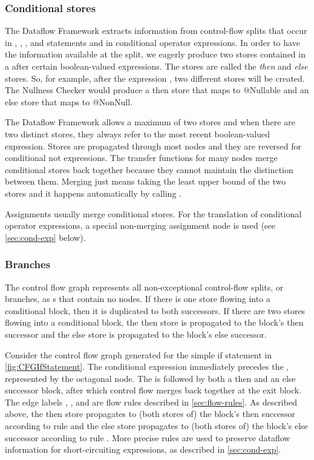 \subsubsection{Conditional stores}
\label{sec:cond-stores}

The Dataflow Framework extracts information from control-flow splits
that occur in , , , and 
statements and in conditional operator expressions.  In order to have
the information available at the split, we eagerly produce two stores
contained in a  after certain
boolean-valued expressions.  The stores are called the \emph{then} and
\emph{else} stores.  So, for example, after the expression , two different stores will be created.  The Nullness Checker
would produce a then store that maps  to @Nullable and an else
store that maps  to @NonNull.

The Dataflow Framework allows a maximum of two stores and when there
are two distinct stores, they always refer to the most recent
boolean-valued expression.  Stores are propagated through most nodes
and they are reversed for conditional not expressions.  The transfer
functions for many nodes merge conditional stores back together
because they cannot maintain the distinction between them.  Merging
just means taking the least upper bound of the two stores and it
happens automatically by calling .

Assignments usually merge conditional stores. For the translation of
conditional operator expressions, a special non-merging assignment
node is used (see \autoref{sec:cond-exp} below).

\subsubsection{Branches}

The control flow graph represents all non-exceptional control-flow
splits, or branches, as s that contain no
nodes.  If there is one store flowing into a conditional block, then
it is duplicated to both successors.  If there are two stores flowing
into a conditional block, the then store is propagated to the block's
then successor and the else store is propagated to the block's else
successor.

Consider the control flow graph generated for the simple if statement
in \autoref{fig:CFGIfStatement}.  The conditional expression 
immediately precedes the , represented by the
octagonal node.  The  is followed by both a
then and an else successor block, after which control flow merges back
together at the exit block.  The edge labels ,
, and  are flow rules described
in \autoref{sec:flow-rules}.  As described above, the then store
propagates to (both stores of) the block's then successor according to
rule  and the else store propagates to (both stores
of) the block's else successor according to rule .
More precise rules are used to preserve dataflow information for
short-circuiting expressions, as described in \autoref{sec:cond-exp}.

